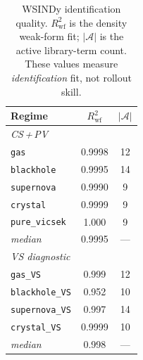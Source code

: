 \begin{table}[ht]
\centering
\caption{WSINDy identification quality.
$R^2_{\mathrm{wf}}$ is the density weak-form fit;
$|\mathcal{A}|$ is the active library-term count.
These values measure \emph{identification} fit, not rollout skill.}
\label{tab:wsindy_ident}
\renewcommand{\arraystretch}{0.92}
\footnotesize
\setlength{\tabcolsep}{12pt}
\begin{tabular}{lcc}
\toprule
\textbf{Regime} & $R^2_{\text{wf}}$ & $|\mathcal{A}|$ \\
\midrule
\multicolumn{3}{l}{\textit{CS\,+\,PV}} \\
\texttt{gas}           & 0.9998  & 12 \\
\texttt{blackhole}     & 0.9995  & 14 \\
\texttt{supernova}     & 0.9990  & 9 \\
\texttt{crystal}       & 0.9999  & 9 \\
\texttt{pure\_vicsek}  & 1.000   & 9 \\
\rowcolor{gray!10}
\quad\textit{median} & 0.9995  & --- \\
\midrule
\multicolumn{3}{l}{\textit{VS diagnostic}} \\
\texttt{gas\_VS}       & 0.999   & 12 \\
\texttt{blackhole\_VS} & 0.952   & 10 \\
\texttt{supernova\_VS} & 0.997   & 14 \\
\texttt{crystal\_VS}   & 0.9999  & 10 \\
\rowcolor{gray!10}
\quad\textit{median}        & 0.998   & --- \\
\bottomrule
\end{tabular}
\end{table}

